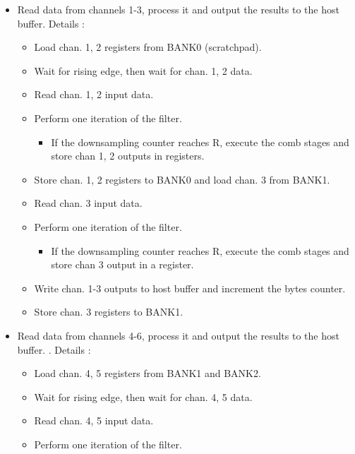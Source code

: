 \documentclass[]{report}
\providecommand{\tightlist}{%
	\setlength{\itemsep}{0pt}\setlength{\parskip}{0pt}}
\begin{document}
\begin{itemize}
\tightlist
\item
  Read data from channels 1-3, process it and output the results to the
  host buffer. Details :

  \begin{itemize}
  \tightlist
  \item
    Load chan. 1, 2 registers from BANK0 (scratchpad).
  \item
    Wait for rising edge, then wait for chan. 1, 2 data.
  \item
    Read chan. 1, 2 input data.
  \item
    Perform one iteration of the filter.

    \begin{itemize}
    \tightlist
    \item
      If the downsampling counter reaches R, execute the comb stages and
      store chan 1, 2 outputs in registers.
    \end{itemize}
  \item
    Store chan. 1, 2 registers to BANK0 and load chan. 3 from BANK1.
  \item
    Read chan. 3 input data.
  \item
    Perform one iteration of the filter.

    \begin{itemize}
    \tightlist
    \item
      If the downsampling counter reaches R, execute the comb stages and
      store chan 3 output in a register.
    \end{itemize}
  \item
    Write chan. 1-3 outputs to host buffer and increment the bytes counter.
  \item
    Store chan. 3 registers to BANK1.
  \end{itemize}
\item
   Read data from channels 4-6, process it and output the results to the
   host buffer. . Details :

  \begin{itemize}
  \tightlist
  \item
    Load chan. 4, 5 registers from BANK1 and BANK2.
  \item
    Wait for rising edge, then wait for chan. 4, 5 data.
  \item
    Read chan. 4, 5 input data.
  \item
    Perform one iteration of the filter.


\end{itemize}
\end{itemize}
\end{document}
